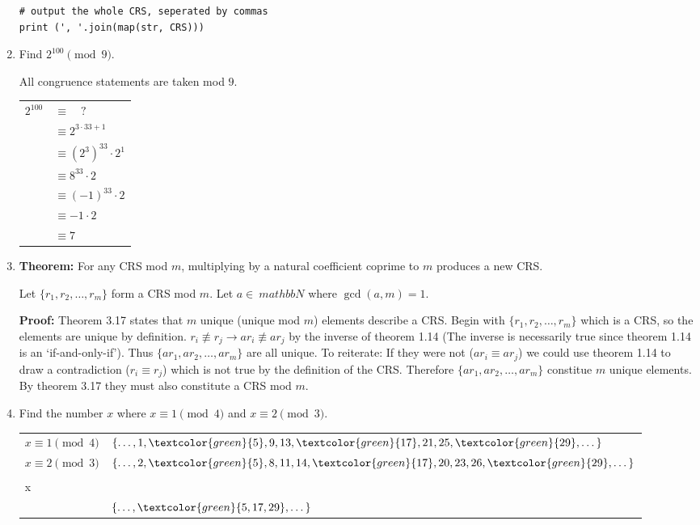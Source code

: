 \documentclass[12pt,letterpaper]{article}
\begin{document}
\begin{enumerate}[leftmargin=0mm]
\begin{verbatim}
# output the whole CRS, seperated by commas
print (', '.join(map(str, CRS)))
\end{verbatim}

\item Find \(2^{100} \pmod 9\).

All congruence statements are taken mod \(9\).

\begin{tabular}[t]{l l}
\(2^{100}\) & \(\equiv \quad ?\)\\
& \(\equiv 2^{3 \cdot 33 + 1}\) \\
& \(\equiv (2^3)^{33} \cdot 2^1\) \\
& \(\equiv 8^{33} \cdot 2 \) \\
& \(\equiv (-1)^{33} \cdot 2\) \\
& \(\equiv -1 \cdot 2\) \\
& \(\equiv 7\) \\
\end{tabular}

\item \textbf{Theorem:} For any CRS mod \(m\), multiplying by a natural coefficient coprime to \(m\) produces a new CRS.

Let \(\{r_1, r_2, \dots, r_m\}\) form a CRS mod \(m\). Let \(a \in\ mathbb N\) where \(\gcd(a, m) = 1\).

\textbf{Proof:} Theorem 3.17 states that \(m\) unique (unique mod \(m\)) elements describe a CRS. Begin with \(\{r_1, r_2, \dots, r_m\}\) which is a CRS, so the elements are unique by definition. \(r_i \not\equiv r_j \rightarrow a r_i \not\equiv a r_j\) by the inverse of theorem 1.14 (The inverse is necessarily true since theorem 1.14 is an `if-and-only-if'). Thus \(\{a r_1, a r_2, \dots, a r_m\}\) are all unique. To reiterate: If they were not (\(a r_i \equiv a r_j\)) we could use theorem 1.14 to draw a contradiction (\(r_i \equiv r_j\)) which is not true by the definition of the CRS. Therefore \(\{a r_1, a r_2, \dots, a r_m\}\) constitue \(m\) unique elements. By theorem 3.17 they must also constitute a CRS mod \(m\).

\item Find the number \(x\) where \(x \equiv 1 \pmod 4\) and \(x \equiv 2 \pmod 3\).

\begin{tabular}{ll}
\(x \equiv 1 \pmod 4\) & \(\{\dots, 1, \textcolor{green}{5}, 9, 13, \textcolor{green}{17}, 21, 25, \textcolor{green}{29}, \dots\}\) \\
\(x \equiv 2 \pmod 3\) & \(\{\dots, 2, \textcolor{green}{5}, 8, 11, 14, \textcolor{green}{17}, 20, 23, 26, \textcolor{green}{29}, \dots\}\) \\
\(
\left.\!\!\!
\begin{array}{l}
x \equiv 1 \pmod 4 \\ 
x \equiv 2 \pmod 3 \\
\end{array}
\right \}
\)
& \(\{\dots, \textcolor{green}{5, 17, 29}, \dots\}\) \\
\end{tabular}


\end{enumerate}
\end{document}
